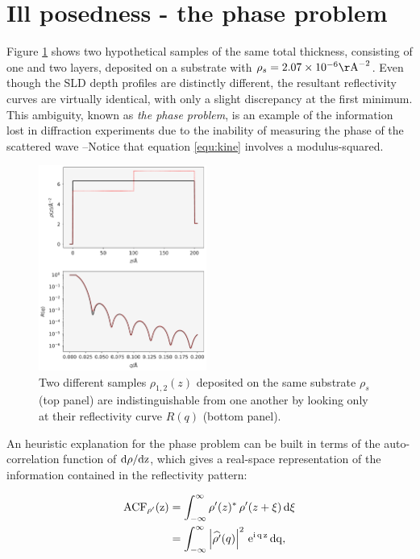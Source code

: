 \documentclass[
 reprint,
 superscriptaddress,
 amsmath,amssymb,
 aps,
]{revtex4-1}
\newcommand{\rmd}{\rm{d}}
\newcommand{\acf}{\rm{ACF}}
\newcommand{\angstrom}{\rm{\AA}}
\newcommand{\scinot}[2]{ {#1} \times 10^{#2} }
\begin{document}
\section{Ill posedness - the phase problem}

Figure \ref{fig:phase_problem_sld} shows two hypothetical samples of the same total thickness,
consisting of one and two layers, deposited on a substrate with
$\rho_s = \scinot{2.07}{-6} \angstrom^{-2}$. Even though the SLD depth profiles are distinctly
different, the resultant reflectivity curves are virtually identical,
with only a slight discrepancy at the first minimum. This ambiguity,
known as \textit{the phase problem}, is
an example of the information lost in diffraction experiments due
to the inability of measuring the phase of the scattered wave
--Notice that equation \ref{equ:kine} involves a modulus-squared.

\begin{figure}
    \includegraphics[width=0.49\textwidth]{phase_problem_SLD.pdf} 
    \caption{Two different samples $\rho_{1,2}(z)$ deposited on the same substrate $\rho_s$ (top panel)
    are indistinguishable from one another by looking only at their reflectivity curve $R(q)$
    (bottom panel).}
    \label{fig:phase_problem_sld}
\end{figure}

An heuristic explanation for the phase problem
can be built in terms of the auto-correlation function of $\rmd\rho/\rmd z$, which gives a
real-space representation of the information contained in the reflectivity pattern:

\begin{equation}
    \begin{split}
        \acf_{\rho'}(z) & = \int_{-\infty}^{\infty} \rho'(z)^* \, \rho'(z + \xi) \, \rmd \xi \\
                        & = \int_{-\infty}^{\infty} \left| \widehat{\rho'}(q)  \right|^{2} \, \rm{e}^{i\,q\,z} \, \rmd q,
    \end{split}
    \label{equ:acf}
\end{equation}
\end{document}
